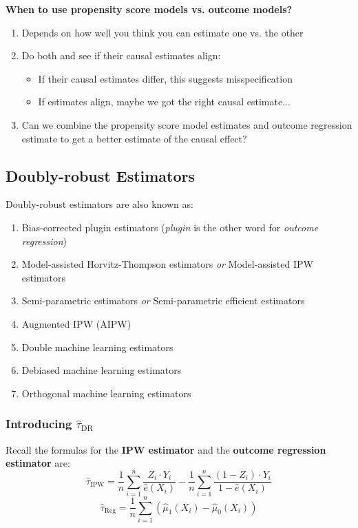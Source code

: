 \textbf{When to use propensity score models vs. outcome models?}
\begin{enumerate}
    \item Depends on how well you think you can estimate one vs. the other
    \item Do both and see if their causal estimates align:
    \begin{itemize}
        \item If their causal estimates differ, this suggests misspecification
        \item If estimates align, maybe we got the right causal estimate...
    \end{itemize}
    \item Can we combine the propensity score model estimates and outcome regression estimate to get a better estimate of the causal effect?
\end{enumerate}

\subsection{Doubly-robust Estimators}
Doubly-robust estimators are also known as:
\begin{enumerate}
    \item Bias-corrected plugin estimators (\emph{plugin} is the other word for \emph{outcome regression})
    \item Model-assisted Horvitz-Thompson estimators \emph{or} Model-assisted IPW estimators
    \item Semi-parametric estimators \emph{or} Semi-parametric efficient estimators
    \item Augmented IPW (AIPW)
    \item Double machine learning estimators
    \item Debiased machine learning estimators
    \item Orthogonal machine learning estimators
\end{enumerate}

\subsubsection{Introducing $\hat{\tau}_{\text{DR}}$}
Recall the formulas for the \textbf{IPW estimator} and the \textbf{outcome regression estimator} are:
\begin{equation}
\hat{\tau}_{\text{IPW}} = \frac{1}{n} \sum_{i=1}^{n} \frac{Z_i \cdot Y_i}{\hat{e}(X_i)} - \frac{1}{n}\sum_{i=1}^{n}\frac{(1-Z_i) \cdot Y_i}{1 - \hat{e}(X_i)}
\end{equation}
\begin{equation}
\hat{\tau}_{\text{Reg}} = \frac{1}{n} \sum_{i=1}^{n} \left( \hat{\mu}_1 \left(X_i\right) - \hat{\mu}_0 \left(X_i\right) \right)
\end{equation}

